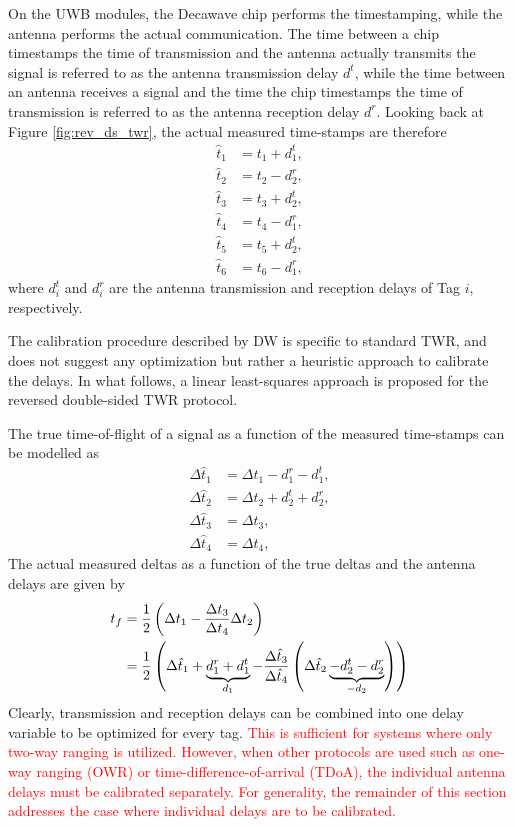 \documentclass{decar-wsd}    %
\begin{document}
On the UWB modules, the Decawave chip performs the timestamping, while the antenna performs the actual communication. The time between a chip timestamps the time of transmission and the antenna actually transmits the signal is referred to as the antenna transmission delay $d^t$, while the time between an antenna receives a signal and the time the chip timestamps the time of transmission is referred to as the antenna reception delay $d^r$. Looking back at Figure \ref{fig:rev_ds_twr}, the actual measured time-stamps are therefore
\begin{align}
    \hat{t}_1 &= t_1 + d_1^t, \\
    \hat{t}_2 &= t_2 - d_2^r, \\
    \hat{t}_3 &= t_3 + d_2^t, \\
    \hat{t}_4 &= t_4 - d_1^r, \\ 
    \hat{t}_5 &= t_5 + d_2^t, \\
    \hat{t}_6 &= t_6 - d_1^r,
\end{align}
where $d_i^t$ and $d_i^r$ are the antenna transmission and reception delays of Tag $i$, respectively.

The calibration procedure described by DW is specific to standard TWR, and does not suggest any optimization but rather a heuristic approach to calibrate the delays. In what follows, a linear least-squares approach is proposed for the reversed double-sided TWR protocol.

The true time-of-flight of a signal as a function of the measured time-stamps can be modelled as
\begin{align}
    \Delta \hat{t}_1 &= \Delta t_1 - d_1^r - d_1^t, \\
    \Delta \hat{t}_2 &= \Delta t_2 + d_2^t + d_2^r, \\
    \Delta \hat{t}_3 &= \Delta t_3, \\
    \Delta \hat{t}_4 &= \Delta t_4,
\end{align}
The actual measured deltas as a function of the true deltas and the antenna delays are given by
\begin{align}
    t_f &= \frac{1}{2} \left( \Delta {t}_1 - \frac{ \Delta {t}_3}{\Delta {t}_4} \Delta {t}_2 \right) \\
    &= \frac{1}{2} \left( \Delta \hat{t}_1 + \underbrace{ d_1^r + d_1^t}_{d_1} - \frac{ \Delta \hat{t}_3}{\Delta \hat{t}_4} \left( \Delta \hat{t}_2  \underbrace{ - d_2^t - d_2^r}_{-d_2} \right) \right) \label{eq:tof_with_delays}
\end{align}
Clearly, transmission and reception delays can be combined into one delay variable to be optimized for every tag. \textcolor{red}{This is sufficient for systems where only two-way ranging is utilized. However, when other protocols are used such as one-way ranging (OWR) or time-difference-of-arrival (TDoA), the individual antenna delays must be calibrated separately. For generality, the remainder of this section addresses the case where individual delays are to be calibrated.}
\end{document}
